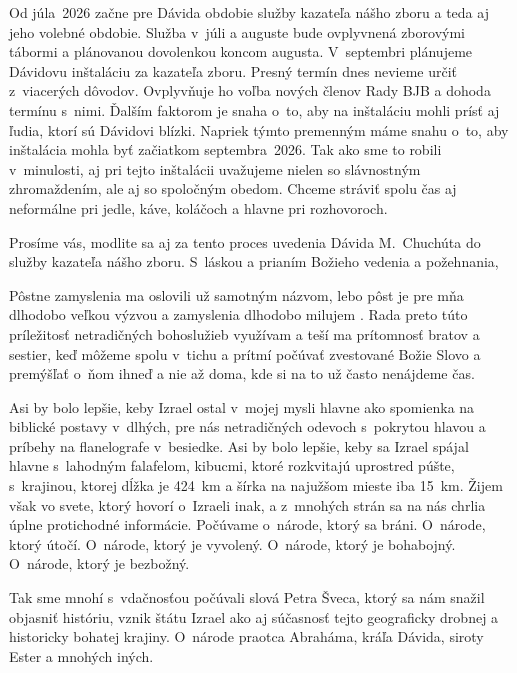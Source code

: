 Od júla~2026 začne pre Dávida obdobie služby kazateľa nášho zboru a teda aj jeho volebné obdobie. Služba v~júli a auguste bude ovplyvnená zborovými tábormi a plánovanou dovolenkou koncom augusta.
V~septembri plánujeme Dávidovu inštaláciu za kazateľa zboru. Presný termín dnes nevieme určiť z~viacerých dôvodov. Ovplyvňuje ho voľba nových členov Rady BJB a dohoda termínu s~nimi. Ďalším faktorom je snaha o~to, aby na inštaláciu mohli prísť aj ľudia, ktorí sú Dávidovi blízki. Napriek týmto premenným máme snahu o~to, aby inštalácia mohla byť začiatkom septembra~2026.
Tak ako sme to robili v~minulosti, aj pri tejto inštalácii uvažujeme nielen so slávnostným zhromaždením, ale aj so spoločným obedom. Chceme stráviť spolu čas aj neformálne pri jedle, káve, koláčoch a hlavne pri rozhovoroch.

Prosíme vás, modlite sa aj za tento proces uvedenia Dávida M.~Chuchúta do služby kazateľa nášho zboru.
S~láskou a prianím Božieho vedenia a požehnania,



Pôstne zamyslenia ma oslovili už samotným názvom, lebo pôst je pre mňa dlhodobo veľkou výzvou a zamyslenia dlhodobo milujem \smiley. Rada preto túto príležitosť netradičných bohoslužieb využívam a teší ma prítomnosť bratov a sestier, keď môžeme spolu v~tichu a prítmí počúvať zvestované Božie Slovo a premýšľať o~ňom ihneď a nie až doma, kde si na to už často nenájdeme čas.


Asi by bolo lepšie, keby Izrael ostal v~mojej mysli hlavne ako spomienka na biblické postavy v~dlhých, pre nás netradičných odevoch s~pokrytou hlavou a príbehy na flanelografe v~besiedke.
Asi by bolo lepšie, keby sa Izrael spájal hlavne s~lahodným falafelom, kibucmi, ktoré rozkvitajú uprostred púšte, s~krajinou, ktorej dĺžka je 424~km a šírka na najužšom mieste iba 15~km.
Žijem však vo svete, ktorý hovorí o~Izraeli inak, a z~mnohých strán sa na nás chrlia úplne protichodné informácie.
Počúvame o~národe, ktorý sa bráni. O~národe, ktorý útočí. O~národe, ktorý je vyvolený. O~národe, ktorý je bohabojný. O~národe, ktorý je bezbožný.

Tak sme mnohí s~vdačnosťou počúvali slová Petra Šveca, ktorý sa nám snažil objasniť históriu, vznik štátu Izrael ako aj súčasnosť tejto geograficky drobnej a historicky bohatej krajiny. O~národe praotca Abraháma, kráľa Dávida, siroty Ester a mnohých iných.

